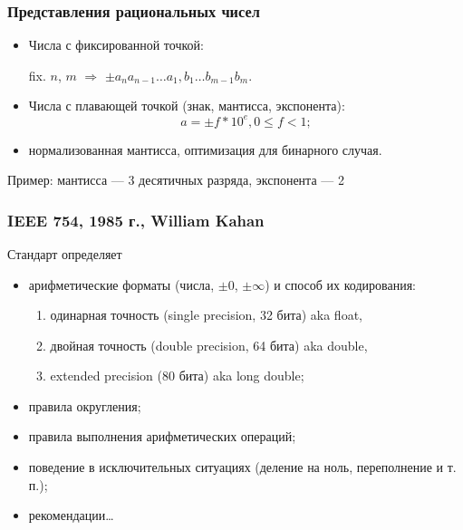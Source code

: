 \begin{frame}
\frametitle{Представления рациональных чисел}
\begin{itemize}
    \pause\item Числа с фиксированной точкой:\\
    \begin{center}
    fix. $n$, $m$ $\Rightarrow$
    $\pm a_n a_{n-1} \ldots a_1 , b_1 \ldots b_{m-1} b_m$.
	\end{center}

    \pause\item Числа с плавающей точкой (знак, мантисса, экспонента):
    \[
        a = \pm f * 10^{e}, 0 \leqslant f < 1;
    \]

    \pause\item нормализованная мантисса\pause, оптимизация для бинарного случая.
\end{itemize}

\pause
\begin{block}{Пример: мантисса — 3 десятичных разряда, экспонента — 2}


\end{block}


\end{frame}

\begin{frame}
\frametitle{IEEE 754, 1985 г., William Kahan}
Стандарт определяет
\begin{itemize}
    \item арифметические форматы (числа, $\pm 0$, $\pm \infty$) и способ их кодирования: %
{}

    \begin{enumerate}
        \item одинарная точность (single precision, 32 бита) aka float,
        \item двойная точность (double precision, 64 бита) aka double,
        \item extended precision (80 бита) aka long double;
    \end{enumerate}
    \item правила округления;
    \item правила выполнения арифметических операций;
    \item поведение в исключительных ситуациях (деление на ноль, переполнение и т. п.);
    \item рекомендации…
\end{itemize}
\end{frame}


